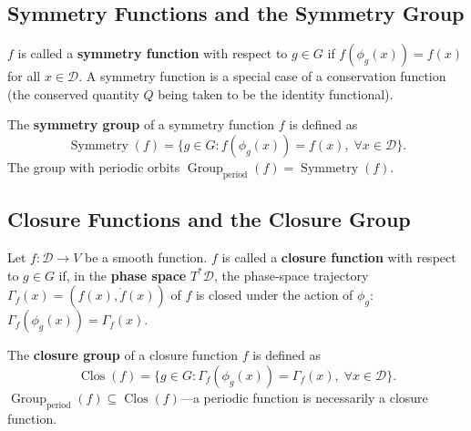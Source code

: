 \subsection{\texorpdfstring{Symmetry Functions and the Symmetry Group}{Symmetry Functions and the Symmetry Group}}

\begin{definition}\label{def:symmetry_function_gf}
$f$ is called a \textbf{symmetry function} with respect to $g \in G$ if $f(\phi_g(x)) = f(x)$ for all $x \in \mathcal{D}$. A symmetry function is a special case of a conservation function (the conserved quantity $Q$ being taken to be the identity functional).
\end{definition}

\begin{definition}\label{def:symmetry_group_gf}
The \textbf{symmetry group} of a symmetry function $f$ is defined as
\[
\operatorname{Symmetry}(f) = \{g \in G : f(\phi_g(x)) = f(x),\; \forall x \in \mathcal{D}\}.
\]
The group with periodic orbits $\operatorname{Group}_{\mathrm{period}}(f) = \operatorname{Symmetry}(f)$.
\end{definition}

\subsection{\texorpdfstring{Closure Functions and the Closure Group}{Closure Functions and the Closure Group}}

\begin{definition}\label{def:closure_function_gf}
Let $f: \mathcal{D} \to V$ be a smooth function. $f$ is called a \textbf{closure function} with respect to $g \in G$ if, in the \textbf{phase space} $T^*\mathcal{D}$, the phase-space trajectory $\Gamma_f(x) = (f(x), \dot{f}(x))$ of $f$ is closed under the action of $\phi_g$: $\Gamma_f(\phi_g(x)) = \Gamma_f(x)$.
\end{definition}

\begin{definition}\label{def:closure_group_gf}
The \textbf{closure group} of a closure function $f$ is defined as
\[
\operatorname{Clos}(f) = \{g \in G : \Gamma_f(\phi_g(x)) = \Gamma_f(x),\; \forall x \in \mathcal{D}\}.
\]
$\operatorname{Group}_{\mathrm{period}}(f) \subseteq \operatorname{Clos}(f)$---a periodic function is necessarily a closure function.
\end{definition}

